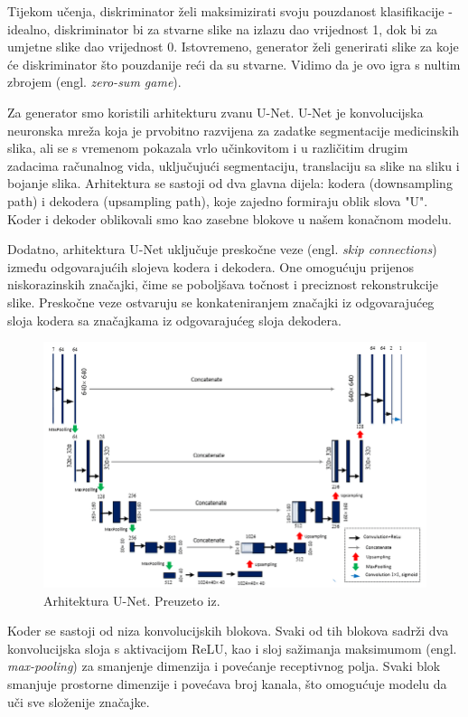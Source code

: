 \documentclass[conference]{IEEEtran}
\begin{document}
Tijekom učenja, diskriminator želi maksimizirati svoju pouzdanost klasifikacije - idealno, diskriminator bi za stvarne slike na izlazu dao vrijednost 1, dok bi za umjetne slike dao vrijednost 0. Istovremeno, generator želi generirati slike za koje će diskriminator što pouzdanije reći da su stvarne. Vidimo da je ovo igra s nultim zbrojem (engl. \textit{zero-sum game}).

Za generator smo koristili arhitekturu zvanu U-Net\cite{ronneberger2015unet}.
U-Net je konvolucijska neuronska mreža koja je prvobitno razvijena za zadatke segmentacije medicinskih slika, ali se s vremenom pokazala vrlo učinkovitom i u različitim drugim zadacima računalnog vida, uključujući segmentaciju, translaciju sa slike na sliku i bojanje slika.
Arhitektura se sastoji od dva glavna dijela: kodera (downsampling path) i dekodera (upsampling path), koje zajedno formiraju oblik slova "U". Koder i dekoder oblikovali smo kao zasebne blokove u našem konačnom modelu.

Dodatno, arhitektura U-Net uključuje preskočne veze (engl. \textit{skip connections}) između odgovarajućih slojeva kodera i dekodera. One omogućuju prijenos niskorazinskih značajki, čime se poboljšava točnost i preciznost rekonstrukcije slike.
Preskočne veze ostvaruju se konkateniranjem značajki iz odgovarajućeg sloja kodera sa značajkama iz odgovarajućeg sloja dekodera.

\begin{figure}[H]
    \centering
    \includegraphics[width=0.9\linewidth]{imgs/unet.png}
    \caption{Arhitektura U-Net. Preuzeto iz\cite{raudonis2021fast}.}
    \label{fig:arhitektura_unet}
\end{figure}

Koder se sastoji od niza konvolucijskih blokova. Svaki od tih blokova sadrži dva konvolucijska sloja s aktivacijom ReLU, kao i sloj sažimanja maksimumom (engl. \textit{max-pooling}) za smanjenje dimenzija i povećanje receptivnog polja.
Svaki blok smanjuje prostorne dimenzije i povećava broj kanala, što omogućuje modelu da uči sve složenije značajke.
\end{document}
